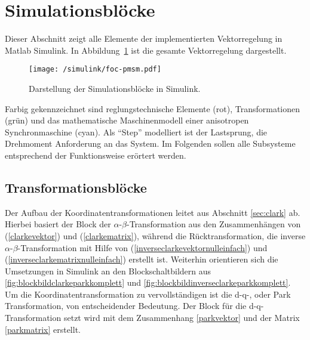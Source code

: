 

\section{Simulationsblöcke}\label{sec:math-model-pmsm}

Dieser Abschnitt zeigt alle Elemente der implementierten Vektorregelung in Matlab Simulink.
In Abbildung~\ref{fig:foc-pmsm} ist die gesamte Vektorregelung dargestellt.

\begin{figure}[h!]
	\texttt{[image: /simulink/foc-pmsm.pdf]}
	\label{fig:foc-pmsm}
	\caption{Darstellung der Simulationsblöcke in Simulink.}
\end{figure}

Farbig gekennzeichnet sind reglungstechnische Elemente (rot), Transformationen (grün) und das mathematische Maschinenmodell einer anisotropen Synchronmaschine (cyan).
Als \enquote{Step} modelliert ist der Lastsprung, die Drehmoment Anforderung an das System.
Im Folgenden sollen alle Subsysteme entsprechend der Funktionsweise erörtert werden.

\subsection{Transformationsblöcke}

Der Aufbau der Koordinatentransformationen leitet aus Abschnitt \ref{sec:clark} ab. 
Hierbei basiert der Block der $\alpha$-$\beta$-Transformation aus den Zusammenhängen von (\ref{clarkevektor}) und (\ref{clarkematrix}), während die Rücktransformation, die inverse $\alpha$-$\beta$-Transformation mit Hilfe von (\ref{inverseclarkevektornulleinfach}) und (\ref{inverseclarkematrixnulleinfach}) erstellt ist.
Weiterhin orientieren sich die Umsetzungen in Simulink an den Blockschaltbildern aus \ref{fig:blockbildclarkeparkkomplett} und \ref{fig:blockbildinverseclarkeparkkomplett}.
Um die Koordinatentransformation zu vervollständigen ist die d-q-, oder Park Transformation, von entscheidender Bedeutung.
Der Block für die d-q-Transformation setzt wird mit dem Zusammenhang \ref{parkvektor} und der Matrix \ref{parkmatrix} erstellt. 

